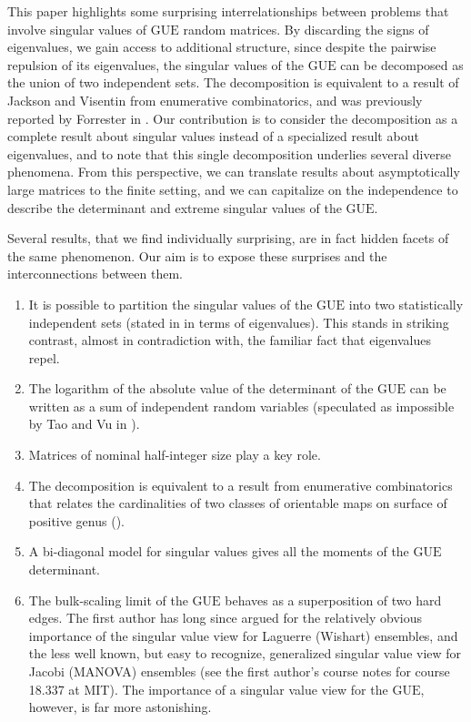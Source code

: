 \documentclass[pdftex, oneside, 10pt, letterpaper]{amsart}
\theoremstyle{plain}
\theoremstyle{definition}
\theoremstyle{remark}
\begin{document}
This paper highlights some surprising interrelationships between
problems that involve singular values of {\ensuremath{\mathrm{GUE}}}{} random matrices.  By
discarding the signs of eigenvalues, we gain access to additional
structure, since despite the pairwise repulsion of its eigenvalues,
the singular values of the {\ensuremath{\mathrm{GUE}}}{} can be decomposed as the union of
two independent sets.  The decomposition is equivalent to a result of
Jackson and Visentin \cite{JV-Eulerian} from enumerative
combinatorics, and was previously reported by Forrester in
\cite[Sec.~2.2]{Forrester-Evenness}.  Our contribution is to consider
the decomposition as a complete result about singular values instead
of a specialized result about eigenvalues, and to note that this
single decomposition underlies several diverse phenomena.  From this
perspective, we can translate results about asymptotically large
matrices to the finite setting, and we can capitalize on the
independence to describe the determinant and extreme singular values
of the {\ensuremath{\mathrm{GUE}}}{}.

Several results, that we find individually surprising, are in fact hidden
facets of the same phenomenon.  Our aim is to expose these surprises
and the interconnections between them.
\begin{enumerate}
\item It is possible to partition the singular values of the {\ensuremath{\mathrm{GUE}}}{}
  into two statistically independent sets (stated in
  \cite{Forrester-Evenness} in terms of eigenvalues).  This stands
  in striking contrast, almost in contradiction with, the familiar
  fact that eigenvalues repel.
\item The logarithm of the absolute value of the determinant of the
  {\ensuremath{\mathrm{GUE}}}{} can be written as a sum of independent random variables
  (speculated as impossible by Tao and Vu in \cite{TV}).
\item Matrices of nominal half-integer size play a key role.
\item The decomposition is equivalent to a result from enumerative
  combinatorics that relates the cardinalities of two classes of
  orientable maps on surface of positive genus (\cite{JV-Eulerian}).
\item A bi-diagonal model for singular values gives all the moments of
  the {\ensuremath{\mathrm{GUE}}}{} determinant.
\item The bulk-scaling limit of the {\ensuremath{\mathrm{GUE}}}{} behaves as a superposition
  of two hard edges.  The first author has long since argued for the
  relatively obvious importance of the singular value view for
  Laguerre (Wishart) ensembles, and the less well known, but easy to
  recognize, generalized singular value view for Jacobi (MANOVA)
  ensembles (see the first author's course notes for course 18.337 at
  MIT).  The importance of a singular value view for the {\ensuremath{\mathrm{GUE}}},
  however, is far more astonishing.
\end{enumerate}
\end{document}
